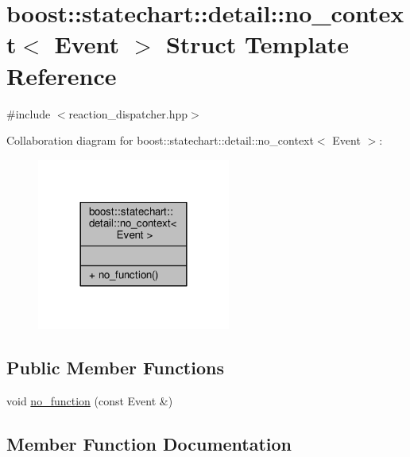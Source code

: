 \hypertarget{structboost_1_1statechart_1_1detail_1_1no__context}{}\section{boost\+:\+:statechart\+:\+:detail\+:\+:no\+\_\+context$<$ Event $>$ Struct Template Reference}
\label{structboost_1_1statechart_1_1detail_1_1no__context}


{\ttfamily \#include $<$reaction\+\_\+dispatcher.\+hpp$>$}



Collaboration diagram for boost\+:\+:statechart\+:\+:detail\+:\+:no\+\_\+context$<$ Event $>$\+:
\nopagebreak
\begin{figure}[H]
\begin{center}
\leavevmode
\includegraphics[width=180pt]{structboost_1_1statechart_1_1detail_1_1no__context__coll__graph}
\end{center}
\end{figure}
\subsection*{Public Member Functions}
\begin{DoxyCompactItemize}
\item 
void \mbox{\hyperlink{structboost_1_1statechart_1_1detail_1_1no__context_a79514e61388ee4c73fd4d6fbd6f0c872}{no\+\_\+function}} (const Event \&)
\end{DoxyCompactItemize}


\subsection{Member Function Documentation}
\mbox{\label{structboost_1_1statechart_1_1detail_1_1no__context_a79514e61388ee4c73fd4d6fbd6f0c872}} 
